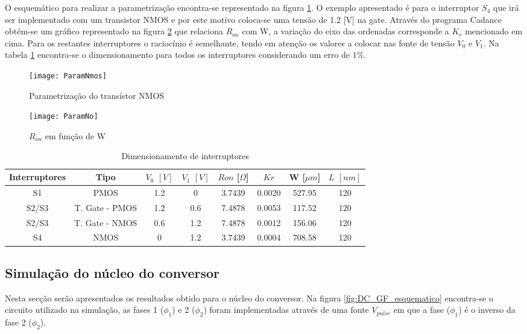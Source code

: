 \documentclass[12pt]{article}
\begin{document}
O esquemático para realizar a parametrização encontra-se representado na figura \ref{fig:esquematicop}. O exemplo apresentado é para o interruptor $S_4$ que irá ser implementado com um transistor NMOS e por este motivo coloca-se uma tensão de 1.2 [V] na gate. Através do programa Cadance obtém-se um gráfico representado na figura \ref{fig:graficoRon} que relaciona $R_{on}$ com W, a variação do eixo das ordenadas corresponde a $K_r$ mencionado em cima. Para os restantes interruptores o raciocínio é semelhante, tendo em atenção os valores a colocar nas fonte de tensão $V_0$ e  $V_1$. Na tabela \ref{tab:dimensionamento} encontra-se o dimensionamento para todos os interruptores considerando um erro de $1\%$.



\begin{figure}[htbp]
	\centering
	\texttt{[image: ParamNmos]}
	\caption{Parametrização do transístor NMOS}
	\label{fig:esquematicop}
\end{figure}
\begin{figure}[htbp]
	\centering
	\texttt{[image: ParamNo]}
	\caption{$R_{on}$ em função de W}
	\label{fig:graficoRon}
\end{figure}


\begin{table}[hbtp]
\centering
\caption{Dimensionamento de interruptores}
\label{tab:dimensionamento}
\begin{tabular}{|c|c|c|c|c|c|c|c|}
\hline
Interruptores & Tipo                      & $V_0$ $[V]$  &$V_1$ $[V]$  & $Ron$ [$\Omega$]    & $Kr$        & W [$\mu m$]     & $L$ $[nm]$   \\ \hline
S1            & PMOS                     & 1.2 & 0   & 3.7439 & 0.0020     & 527.95 & 120 \\ \hline
S2/S3         & T. Gate - PMOS & 1.2 & 0.6 & 7.4878 & 0.0053     & 117.52 & 120 \\ \hline
S2/S3         & T. Gate - NMOS & 0.6 & 1.2 & 7.4878 & 0.0012     & 156.06 & 120 \\ \hline
S4            & NMOS                     & 0   & 1.2 & 3.7439 & 0.0004 & 708.58 & 120 \\ \hline
\end{tabular}
\end{table}
\vspace{5mm}
\subsection{Simulação do núcleo do conversor}
Nesta secção serão apresentados os resultados obtido para o núcleo do conversor. Na figura \ref{fig:DC_GF_esquematico} encontra-se o circuito utilizado na simulação, as fases 1 ($\phi_1$) e 2 ($\phi_2$) foram implementadas através de uma fonte $V_{pulse}$ em que a fase ($\phi_1$) é o inverso da fase 2 ($\phi_2$).
\vspace{5mm}
\end{document}
